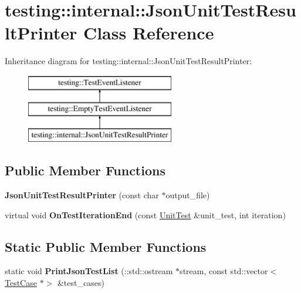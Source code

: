 \hypertarget{classtesting_1_1internal_1_1_json_unit_test_result_printer}{}\section{testing\+:\+:internal\+:\+:Json\+Unit\+Test\+Result\+Printer Class Reference}
\label{classtesting_1_1internal_1_1_json_unit_test_result_printer}
Inheritance diagram for testing\+:\+:internal\+:\+:Json\+Unit\+Test\+Result\+Printer\+:\begin{figure}[H]
\begin{center}
\leavevmode
\includegraphics[height=3.000000cm]{classtesting_1_1internal_1_1_json_unit_test_result_printer}
\end{center}
\end{figure}
\subsection*{Public Member Functions}
\begin{DoxyCompactItemize}
\item 
\mbox{\label{classtesting_1_1internal_1_1_json_unit_test_result_printer_a273623decde1be18db45e95594f9d501}} 
{\bfseries Json\+Unit\+Test\+Result\+Printer} (const char $\ast$output\+\_\+file)
\item 
\mbox{\label{classtesting_1_1internal_1_1_json_unit_test_result_printer_a44edb54cf1ab8cdcd56bda5058b8f1d6}} 
virtual void {\bfseries On\+Test\+Iteration\+End} (const \mbox{\hyperlink{classtesting_1_1_unit_test}{Unit\+Test}} \&unit\+\_\+test, int iteration)
\end{DoxyCompactItemize}
\subsection*{Static Public Member Functions}
\begin{DoxyCompactItemize}
\item 
\mbox{\label{classtesting_1_1internal_1_1_json_unit_test_result_printer_a5f2b7e7c90cbdd2029ddaa6c1ad75de0}} 
static void {\bfseries Print\+Json\+Test\+List} (\+::std\+::ostream $\ast$stream, const std\+::vector$<$ \mbox{\hyperlink{classtesting_1_1_test_case}{Test\+Case}} $\ast$$>$ \&test\+\_\+cases)
\end{DoxyCompactItemize}

